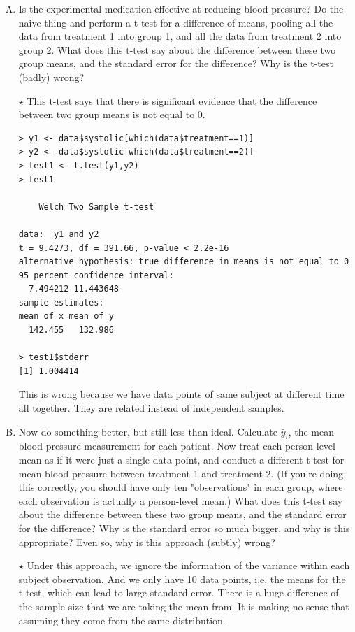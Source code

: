 \documentclass[11pt]{article}
\newcommand{\jie}{$\star$ }
\begin{document}
\begin{enumerate}[(A)]

\item Is the experimental medication effective at reducing blood pressure?  Do the naive thing and perform a t-test for a difference of means, pooling all the data from treatment 1 into group 1, and all the data from treatment 2 into group 2.  What does this t-test say about the difference between these two group means, and the standard error for the difference?  Why is the t-test (badly) wrong?

\bigskip
\jie This t-test says that there is significant evidence that the difference between two group means is not equal to 0.
\begin{lstlisting}
> y1 <- data$systolic[which(data$treatment==1)]
> y2 <- data$systolic[which(data$treatment==2)]
> test1 <- t.test(y1,y2)
> test1

	Welch Two Sample t-test

data:  y1 and y2
t = 9.4273, df = 391.66, p-value < 2.2e-16
alternative hypothesis: true difference in means is not equal to 0
95 percent confidence interval:
  7.494212 11.443648
sample estimates:
mean of x mean of y 
  142.455   132.986 

> test1$stderr
[1] 1.004414
\end{lstlisting}
This is wrong because we have data points of same subject at different time all together. They are related instead of independent samples.
\bigskip

\item Now do something better, but still less than ideal.  Calculate $\bar{y}_i$, the mean blood pressure measurement for each patient.  Now treat each person-level mean as if it were just a single data point, and conduct a different t-test for mean blood pressure between treatment 1 and treatment 2.  (If you're doing this correctly, you should have only ten "observations" in each group, where each observation is actually a person-level mean.) What does this t-test say about the difference between these two group means, and the standard error for the difference?  Why is the standard error so much bigger, and why is this appropriate?  Even so, why is this approach (subtly) wrong?  

\bigskip
\jie
Under this approach, we ignore the information of the variance within each subject observation. And we only have 10 data points, i,e, the means for the t-test, which can lead to large standard error. There is a huge difference of the sample size that we are taking the mean from. It is making no sense that assuming they come from the same distribution.


\end{enumerate}
\end{document}
